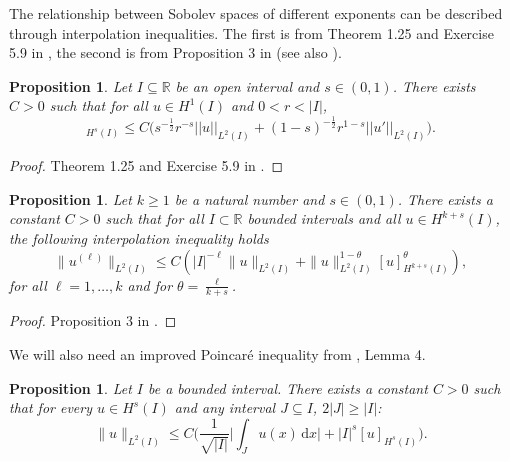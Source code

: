 \documentclass{article}
\newtheorem{Proposition}[Theorem]{Proposition}
\theoremstyle{definition}
\newcommand{\abs}[1]{\left|#1\right|}
\newcommand{\de}{\mathrm{d}}
\newcommand{\R}{\mathbb{R}}
\let\l\ell
\begin{document}
The relationship between Sobolev spaces of different exponents can be described through interpolation inequalities. The first is from Theorem 1.25 and Exercise 5.9 in \cite{Leoni_frac_sob_sp}, the second is from Proposition 3 in \cite{Solci_2024} (see also \cite{Solci_2025}).
\begin{Proposition}
\label{ineq:fractional}
    Let $I \subseteq \R$ be an open interval and $s\in (0,1)$.
 There exists $C>0$ such that for all $u\in H^1(I)$ and $0< r<|I|$,
\begin{equation*}
    [u]_{H^s(I)}\leq C\big( s^{-\frac{1}{2}}r^{-s}|| u||_{L^2(I)}+(1-s)^{-\frac{1}{2}} r^{1-s} ||u'||_{L^2(I)}\big).
\end{equation*}
\end{Proposition}
\begin{proof}
    Theorem 1.25 and  Exercise 5.9 in \cite{Leoni_frac_sob_sp}.
\end{proof}

\begin{Proposition}
\label{ineq:interpolation}
Let $k \geq 1$ be a natural number and $s \in (0,1)$.
 There exists a constant $C > 0$ such that for all $I \subset \R$ bounded intervals  and all
 $u \in H^{k+s}(I)$, the following interpolation inequality holds
    \begin{equation}\label{ineq:interp_solci}
       \|u^{(\l)}\|_{L^2(I)} \leq C \left(|I|^{-\l} \|u\|_{L^2(I)} + \|u\|^{1-\theta}_{L^2(I)}[u]^{\theta}_{H^{k+s}(I)}\right),
    \end{equation}
    for all $\l= 1, \dots, k$ and for $\theta = \frac{\l}{k+s}$.
\end{Proposition}

\begin{proof}
    Proposition 3 in \cite{Solci_2024}.
\end{proof}

We will also need an improved Poincaré inequality from \cite{Solci_2024}, Lemma 4.
\begin{Proposition}
\label{ineq:mean_and_fractional} Let $I$ be a bounded interval.
   There exists a constant $C>0$ such that for every $u\in H^{s}(I)$ and any interval $J\subseteq I$, $2\abs{J} \geq \abs{I}$:
    \[\|u\|_{L^2(I)} \leq C\bigg(\frac{1}{\sqrt{\abs{I}}}\bigg|\int_Ju(x)\,\de x\bigg| + \abs{I}^{s}[u]_{H^s(I)}\bigg).\]

\end{Proposition}
\end{document}
